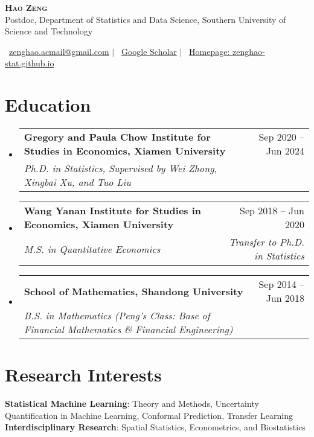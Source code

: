 \documentclass[letterpaper,10pt]{article}
\makeatletter
\newcommand{\resumeSubheading}[4]{
  \vspace{-2pt}\item
    \begin{tabular*}{0.97\textwidth}[t]{l@{\extracolsep{\fill}}r}
      \textbf{#1} & #2 \\
      \textit{\small#3} & \textit{\small #4} \\
    \end{tabular*}\vspace{-7pt}
}
\newcommand{\resumeSubHeadingListStart}{\begin{itemize}[leftmargin=0.15in, label={}]}
\newcommand{\resumeSubHeadingListEnd}{\end{itemize}}
\makeatother
\begin{document}
\begin{center}
    \textbf{\Huge \scshape Hao Zeng}
    \vspace{0.5em}\\
    {\small Postdoc, Department of Statistics and Data Science, Southern University of Science and Technology}
\end{center}

\begin{center}
    \small {}\ \href{mailto:zenghao.acmail@gmail.com}{zenghao.acmail@gmail.com} $|$
    \ \href{https://scholar.google.com/citations?user=-EiBHeIAAAAJ&hl=en}{Google Scholar} $|$
    \ \href{https://zenghao-stat.github.io}{Homepage: zenghao-stat.github.io}
\end{center}

\section{Education}
  \resumeSubHeadingListStart
    \resumeSubheading
      {Gregory and Paula Chow Institute for Studies in Economics, Xiamen University}{Sep 2020 -- Jun 2024}
      {Ph.D. in Statistics, Supervised by Wei Zhong, Xingbai Xu, and Tuo Liu}{}
    
    \resumeSubheading
      {Wang Yanan Institute for Studies in Economics, Xiamen University}{Sep 2018 -- Jun 2020}
      {M.S. in Quantitative Economics}{Transfer to Ph.D. in Statistics}
    
    \resumeSubheading
      {School of Mathematics, Shandong University}{Sep 2014 -- Jun 2018}
      {B.S. in Mathematics (Peng's Class: Base of Financial Mathematics \& Financial Engineering)}{}
  \resumeSubHeadingListEnd


\section{Research Interests}
 \begin{itemize}[leftmargin=0.15in, label={}]
    \small{\item{
     \textbf{Statistical Machine Learning}{: Theory and Methods, Uncertainty Quantification in Machine Learning, Conformal Prediction, Transfer Learning} \\
     \textbf{Interdisciplinary Research}{: Spatial Statistics, Econometrics, and Biostatistics}
    }}
 \end{itemize}
\end{document}
